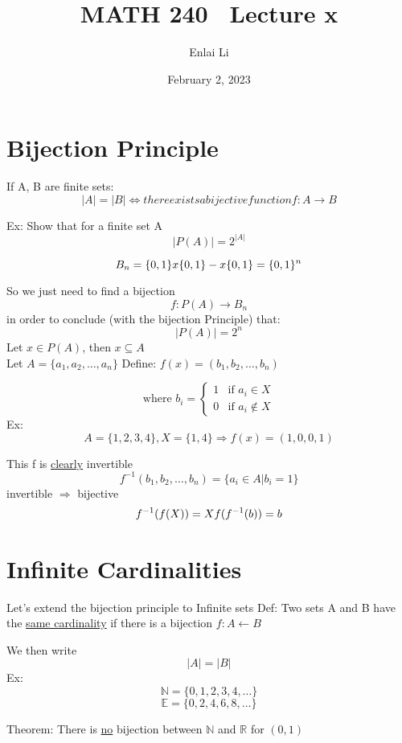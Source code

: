\documentclass{article}
\author{Enlai Li}
\title{MATH 240 \textemdash \ Lecture x}
\date{February 2, 2023}
\begin{document}
\maketitle

\section{Bijection Principle}
If A, B are finite sets: \\

\[|A| = |B| \iff there exists a bijective function f: A \rightarrow B\]

Ex: Show that for a finite set A
\[|P(A)| = 2^{|A|}\]

\[B_n = \{0, 1\} x \{0,1\} - x\{0, 1\} \\
    = \{0,1\}^n\]

So we just need to find a bijection
\[
    f: P(A) \rightarrow B_n\]
in order to conclude (with the bijection Principle) that:
\[|P(A)| = 2^n\]
Let $x \in P(A)$, then $x \subseteq A$ \\
Let $A = \{a_1, a_2, \ldots, a_n\}$
Define: $f(x) = (b_1, b_2, \ldots, b_n)$

\begin{equation}
    \text{where $b_i$} =
    \begin{cases}
        1 & \text{if $a_i \in X$}    \\
        0 & \text{if $a_i \notin X$}
    \end{cases}
\end{equation}
Ex: \[A=\{1,2,3,4\}, X=\{1,4\} \Rightarrow f(x) = (1,0,0,1)\]

This f is \underline{clearly} invertible
\[f^{-1}(b_1, b_2, \ldots, b_n) = \{a_i \in A | b_i = 1\}\]
invertible $\Rightarrow$ bijective
\[f^{-1}(f(X)) = X \\
    f(f^{-1}(b)) = b\]

\section{Infinite Cardinalities}
Let's extend the bijection principle to Infinite sets
Def: Two sets A and B have the \underline{same cardinality} if there is a bijection $f:A\leftarrow B$

We then write \[|A| = |B|\]
Ex:
\[ \mathbb{N} = \{0,1,2,3,4,\ldots \}\]
\[ \mathbb{E} = \{0,2,4,6,8,\ldots \}\]


Theorem: There is \underline{no} bijection between $\mathbb{N}$ and $\mathbb{R}$ for $(0, 1)$
\end{document}
